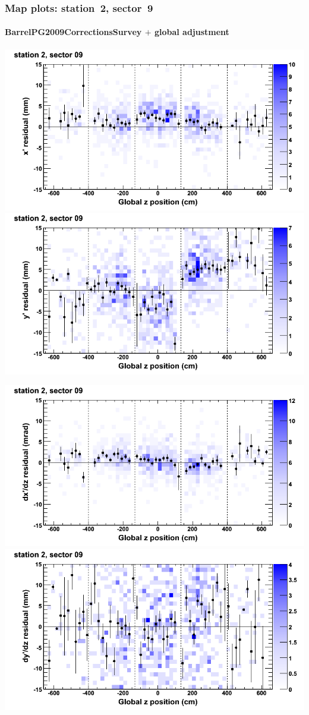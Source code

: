 \documentclass[compress]{beamer}
\begin{document}
\begin{frame}
\frametitle{Map plots: station~2, sector~9}
\framesubtitle{BarrelPG2009CorrectionsSurvey $+$ global adjustment}
\includegraphics[width=0.5\linewidth]{mapplots_re01/DTvsz_st2sec09_x.png}
\includegraphics[width=0.5\linewidth]{mapplots_re01/DTvsz_st2sec09_y.png}

\includegraphics[width=0.5\linewidth]{mapplots_re01/DTvsz_st2sec09_dxdz.png}
\includegraphics[width=0.5\linewidth]{mapplots_re01/DTvsz_st2sec09_dydz.png}
\end{frame}
\end{document}
